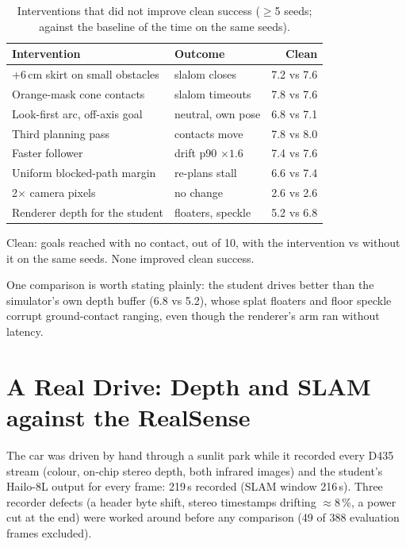 \documentclass[conference]{IEEEtran}
\newcommand{\hailo}{Hailo-8L}
\begin{document}
\begin{table}[t]
\centering\footnotesize
\setlength{\tabcolsep}{3pt}
\caption{Interventions that did not improve clean success ($\geq$5 seeds; against the baseline of the time on the same seeds).}
\label{tab:negative}
\begin{tabular}{@{}p{3.75cm}lr@{}}
\toprule
Intervention & Outcome & Clean \\
\midrule
+6\,cm skirt on small obstacles & slalom closes & 7.2 vs 7.6 \\
Orange-mask cone contacts & slalom timeouts & 7.8 vs 7.6 \\
Look-first arc, off-axis goal & neutral, own pose & 6.8 vs 7.1 \\
Third planning pass & contacts move & 7.8 vs 8.0 \\
Faster follower & drift p90 $\times1.6$ & 7.4 vs 7.6 \\
Uniform blocked-path margin & re-plans stall & 6.6 vs 7.4 \\
2$\times$ camera pixels & no change & 2.6 vs 2.6 \\
Renderer depth for the student & floaters, speckle & 5.2 vs 6.8 \\
\bottomrule
\end{tabular}
\vspace{1mm}\par\raggedright\footnotesize
Clean: goals reached with no contact, out of 10, with the intervention vs without it on the same seeds. None improved
clean success.
\end{table} One comparison is worth stating plainly: the student drives better than the
simulator's own depth buffer (6.8 vs 5.2), whose splat floaters and floor speckle corrupt ground-contact ranging, even though
the renderer's arm ran without latency.

\section{A Real Drive: Depth and SLAM against the RealSense}\label{sec:real}
The car was driven by hand through a sunlit park while it recorded every D435 stream (colour, on-chip stereo depth, both
infrared images) and the student's \hailo{} output for every frame: 219\,s recorded (SLAM window
216\,s). Three recorder defects (a header byte shift, stereo timestamps drifting $\approx$8\,\%,
a power cut at the end) were worked around before any comparison (49 of 388 evaluation frames excluded).
\end{document}
